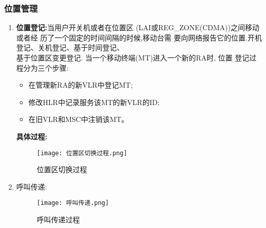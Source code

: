 	\subsubsection{位置管理}
	\begin{enumerate}
		\item \textbf{位置登记:}当用户开关机或者在位置区
		(LAI或REG\_ZONE(CDMA))之间移动或者经
		历了一个固定的时间间隔的时候,移动台需
		要向网络报告它的位置.开机登记、关机登记、基于时间登记、\\
		基于位置区变更登记.
		当一个移动终端(MT)进入一个新的RA时, 位置
		登记过程分为三个步骤:
		\begin{itemize}
			\item  在管理新RA的新VLR中登记MT;
			\item  修改HLR中记录服务该MT的新VLR的ID;
			\item 在旧VLR和MSC中注销该MT。
		\end{itemize}
		\textbf{具体过程:}\\
		\begin{figure}[H]
			\centering
			\texttt{[image: 位置区切换过程.png]}
			\caption{位置区切换过程}
		\end{figure}
	\item 呼叫传递:
	\begin{figure}[H]
		\centering
		\texttt{[image: 呼叫传递.png]}
		\caption{呼叫传递过程}
	\end{figure}
	\end{enumerate}
